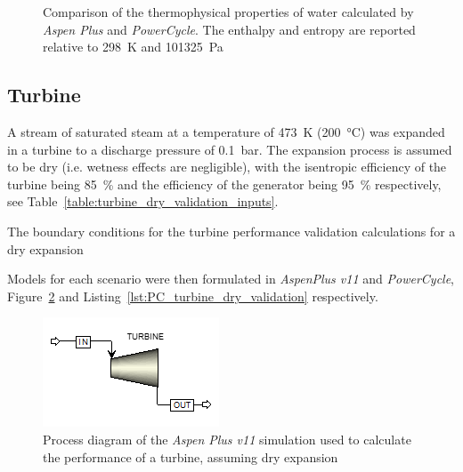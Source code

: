         \begin{figure}[H]
            \centering
            
            \caption[Comparison of the thermophysical properties of water calculated by \emph{Aspen Plus} and \emph{PowerCycle}.]{Comparison of the thermophysical properties of water calculated by \emph{Aspen Plus} and \emph{PowerCycle}. The enthalpy and entropy are reported relative to \qty{298}{\K} and \qty{101325}{\Pa}}
            \label{fig:powercycle_val_water}
        \end{figure}

    \subsection{Turbine}
        \label{sec:PC_dry_turbine_validation}
        A stream of saturated steam at a temperature of \qty{473}{\K} (\qty{200}{\degreeCelsius}) was expanded in a turbine to a discharge pressure of \qty{0.1}{\bar}. The expansion process is assumed to be dry (i.e. wetness effects are negligible), with the isentropic efficiency of the turbine being \qty{85}{\percent} and the efficiency of the generator being \qty{95}{\percent} respectively, see Table~\ref{table:turbine_dry_validation_inputs}.

        \begin{table}[H]
            \caption{The boundary conditions for the turbine performance validation calculations for a dry expansion}
            \centering 
            \label{table:turbine_dry_validation_inputs}
                    
        \end{table}

        Models for each scenario were then formulated in \emph{AspenPlus v11} and \emph{PowerCycle}, Figure~\ref{fig:Aspen_turb_dry_validation} and Listing~\ref{lst:PC_turbine_dry_validation} respectively.

        \begin{figure}[H]
            \centering
            \includegraphics{Content/PowerCycle/Figures/AspenPlus_TurbineDryValidation.png}
            \caption{Process diagram of the \emph{Aspen Plus v11} simulation used to calculate the performance of a turbine, assuming dry expansion}
            \label{fig:Aspen_turb_dry_validation}
        \end{figure}

